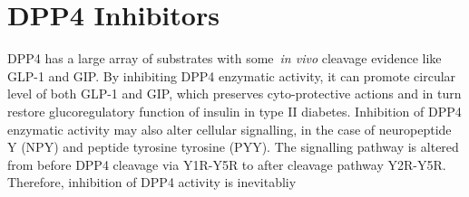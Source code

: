 \section{DPP4 Inhibitors}
DPP4 has a large array of substrates with some~\textit{in vivo} cleavage evidence like GLP-1 and GIP. By inhibiting DPP4 enzymatic activity, it can promote circular level of both GLP-1 and GIP, which preserves cyto-protective actions and in turn restore glucoregulatory function of insulin in type II diabetes. Inhibition of DPP4 enzymatic activity may also alter cellular signalling,  in the case of neuropeptide Y (NPY) and peptide tyrosine tyrosine (PYY). The signalling pathway is altered from before DPP4 cleavage via Y1R-Y5R to after cleavage pathway Y2R-Y5R.~\cite{Mulvihill_2014} Therefore, inhibition of DPP4 activity is inevitabliy  